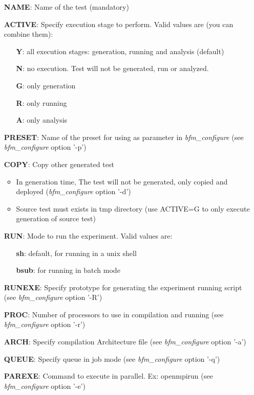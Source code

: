 \begin{itemize}
\item[{\bf NAME}:] Name of the test (mandatory)
\item[{\bf ACTIVE}:] Specify execution stage to perform. Valid values are (you can combine them):
  \begin{itemize}
  \item[{\bf Y}:] all execution stages: generation, running and analysis (default)
  \item[{\bf N}:] no execution. Test will not be generated, run or analyzed. 
  \item[{\bf G}:] only generation
  \item[{\bf R}:] only running
  \item[{\bf A}:] only analysis
  \end{itemize}
\item[{\bf PRESET}:] Name of the preset for using as parameter in {\it bfm\_configure} (see {\it bfm\_configure} option '-p')
\item[{\bf COPY}:] Copy other generated test
  \begin{itemize}
  \item In generation time, The test will not be generated, only copied and deployed ({\it bfm\_configure} option '-d')
  \item Source test must exists in tmp directory (use ACTIVE=G to only execute generation of source test) 
  \end{itemize}
\item[{\bf RUN}:] Mode to run the experiment. Valid values are:
  \begin{itemize}
  \item[{\bf sh}:] default, for running in a unix shell
  \item[{\bf bsub}:] for running in batch mode
  \end{itemize}
\item[{\bf RUNEXE}:] Specify prototype for generating the experiment running script (see {\it bfm\_configure} option '-R')
\item[{\bf PROC}:] Number of processors to use in compilation and running (see {\it bfm\_configure} option '-r')
\item[{\bf ARCH}:] Specify compilation Architecture file (see {\it bfm\_configure} option '-a')
\item[{\bf QUEUE}:] Specify queue in job mode (see {\it bfm\_configure} option '-q')
\item[{\bf PAREXE}:] Command to execute in parallel. Ex: openmpirun (see {\it bfm\_configure} option '-e')

\end{itemize}
